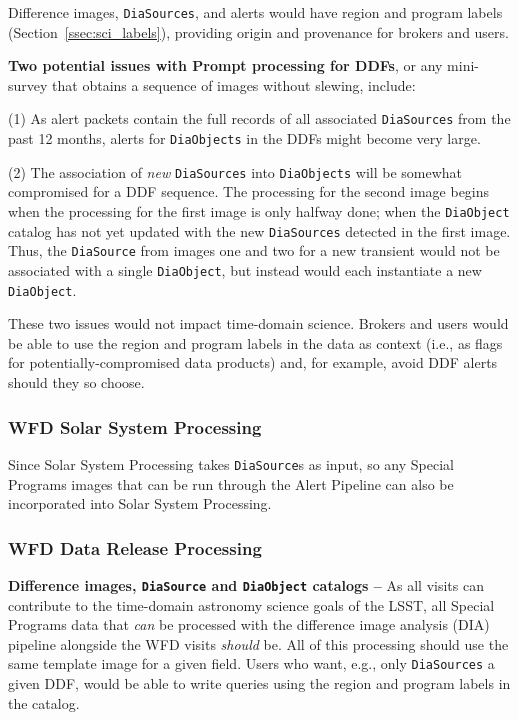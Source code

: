 Difference images, {\tt DiaSources}, and alerts would have region and 
program labels (Section~\ref{ssec:sci_labels}), providing origin and
provenance for brokers and users.

\textbf{Two potential issues with Prompt processing for DDFs}, 
or any mini-survey that obtains a sequence of images without slewing, 
include:

(1) As alert packets contain the full records of all associated 
{\tt DiaSources} from the past 12 months, alerts for {\tt DiaObjects} in 
the DDFs might become very large.

(2) The association of {\it new} {\tt DiaSources} into {\tt DiaObjects} 
will be somewhat compromised for a DDF sequence.
The processing for the second image begins when the processing for the 
first image is only halfway done; when the {\tt DiaObject} catalog has 
not yet updated with the new {\tt DiaSources} detected in the first image.
Thus, the {\tt DiaSource} from images one and two for a new transient 
would not be associated with a single {\tt DiaObject}, but instead would 
each instantiate a new {\tt DiaObject}.

These two issues would not impact time-domain science.
Brokers and users would be able to use the region and program labels
in the data as context (i.e., as flags for potentially-compromised 
data products) and, for example, avoid DDF alerts should they so choose.


\subsubsection{WFD Solar System Processing}

Since Solar System Processing takes {\tt DiaSource}s as input, so any 
Special Programs images that can be run through the Alert Pipeline can 
also be incorporated into Solar System Processing.


\subsubsection{WFD Data Release Processing}

\textbf{Difference images, {\tt DiaSource} and {\tt DiaObject} catalogs -- }
As all visits can contribute to the time-domain astronomy science goals 
of the LSST, all Special Programs data that {\it can} be processed with 
the difference image analysis (DIA) pipeline alongside the WFD visits 
{\it should} be.
All of this processing should use the same template image for a given
field.
Users who want, e.g., only {\tt DiaSources} a given DDF, would be 
able to write queries using the region and program labels in the catalog.

